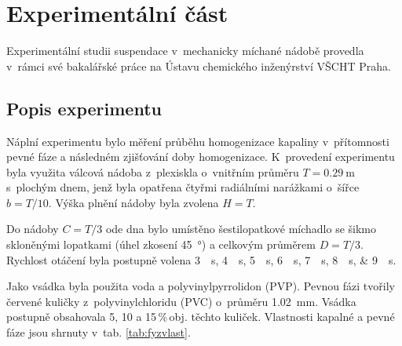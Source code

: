\chapter{Experimentální část}
Experimentální studii suspendace v~mechanicky míchané nádobě provedla \citet{pav11} v~rámci své bakalářské práce na Ústavu chemického inženýrství VŠCHT Praha.

\section{Popis experimentu}
\label{chap:exp}
Náplní experimentu bylo měření průběhu homogenizace kapaliny v~přítomnosti pevné fáze a následném zjišťování doby homogenizace. K~provedení experimentu byla využita válcová nádoba z~plexiskla o~vnitřním průměru $T=\SI{0.29}{\meter}$ s~plochým dnem, jenž byla opatřena čtyřmi radiálními narážkami o~šířce $b=T/10$. Výška plnění nádoby byla zvolena $H=T$. 

Do nádoby $C=T/3$ ode dna bylo umístěno šestilopatkové míchadlo se šikmo skloněnými lopatkami (úhel zkosení \SI{45}{\degree}) a celkovým průměrem  $D=T/3$. Rychlost otáčení byla postupně volena  \SIlist[list-units = single]{3;4;5;6;7;8;9}{\per\second}.

Jako vsádka byla použita voda a polyvinylpyrrolidon (PVP). Pevnou fázi tvořily červené kuličky z~polyvinylchloridu (PVC) o~průměru \SI{1.02}{\milli\meter}. Vsádka postupně obsahovala 5, 10 a 15\,\%\,obj. těchto kuliček. Vlastnosti kapalné a pevné fáze jsou shrnuty v~tab. \ref{tab:fyzvlast}. 

